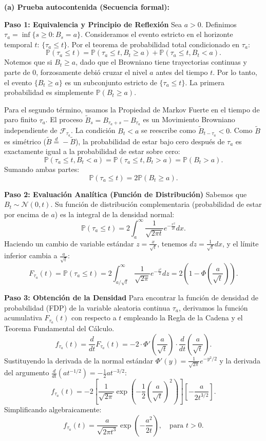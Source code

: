 \documentclass[11pt, letterpaper]{article}
\begin{document}
\begin{solucion}
    \vspace{3mm}
    \textbf{(a) Prueba autocontenida (Secuencia formal):}

    \textbf{Paso 1: Equivalencia y Principio de Reflexión}
    Sea $a > 0$. Definimos $\tau_a = \inf\{s \ge 0 : B_s = a\}$.
    Consideramos el evento estricto en el horizonte temporal $t$: $\{\tau_a \le t\}$.
    Por el teorema de probabilidad total condicionado en $\tau_a$:
    \[ \mathbb{P}(\tau_a \le t) = \mathbb{P}(\tau_a \le t, B_t \ge a) + \mathbb{P}(\tau_a \le t, B_t < a). \]
    Notemos que si $B_t \ge a$, dado que el Browniano tiene trayectorias continuas y parte de 0, forzosamente debió cruzar el nivel $a$ antes del tiempo $t$. Por lo tanto, el evento $\{B_t \ge a\}$ es un subconjunto estricto de $\{\tau_a \le t\}$. La primera probabilidad es simplemente $\mathbb{P}(B_t \ge a)$.
    
    Para el segundo término, usamos la Propiedad de Markov Fuerte en el tiempo de paro finito $\tau_a$. El proceso $\tilde{B}_s = B_{\tau_a + s} - B_{\tau_a}$ es un Movimiento Browniano independiente de $\mathcal{F}_{\tau_a}$.
    La condición $B_t < a$ se reescribe como $\tilde{B}_{t - \tau_a} < 0$.
    Como $\tilde{B}$ es simétrico ($\tilde{B} \stackrel{d}{=} -\tilde{B}$), la probabilidad de estar bajo cero después de $\tau_a$ es exactamente igual a la probabilidad de estar sobre cero:
    \[ \mathbb{P}(\tau_a \le t, B_t < a) = \mathbb{P}(\tau_a \le t, B_t > a) = \mathbb{P}(B_t > a). \]
    Sumando ambas partes:
    \[ \mathbb{P}(\tau_a \le t) = 2 \mathbb{P}(B_t \ge a). \]

    \textbf{Paso 2: Evaluación Analítica (Función de Distribución)}
    Sabemos que $B_t \sim \mathcal{N}(0, t)$. Su función de distribución complementaria (probabilidad de estar por encima de $a$) es la integral de la densidad normal:
    \[ \mathbb{P}(\tau_a \le t) = 2 \int_a^\infty \frac{1}{\sqrt{2\pi t}} e^{-\frac{x^2}{2t}} dx. \]
    Haciendo un cambio de variable estándar $z = \frac{x}{\sqrt{t}}$, tenemos $dz = \frac{1}{\sqrt{t}} dx$, y el límite inferior cambia a $\frac{a}{\sqrt{t}}$:
    \[ F_{\tau_a}(t) = \mathbb{P}(\tau_a \le t) = 2 \int_{a/\sqrt{t}}^\infty \frac{1}{\sqrt{2\pi}} e^{-\frac{z^2}{2}} dz = 2 \left( 1 - \Phi\left(\frac{a}{\sqrt{t}}\right) \right). \]

    \textbf{Paso 3: Obtención de la Densidad}
    Para encontrar la función de densidad de probabilidad (FDP) de la variable aleatoria continua $\tau_a$, derivamos la función acumulativa $F_{\tau_a}(t)$ con respecto a $t$ empleando la Regla de la Cadena y el Teorema Fundamental del Cálculo.
    \[ f_{\tau_a}(t) = \frac{d}{dt} F_{\tau_a}(t) = -2 \cdot \Phi'\left(\frac{a}{\sqrt{t}}\right) \cdot \frac{d}{dt}\left(\frac{a}{\sqrt{t}}\right). \]
    Sustituyendo la derivada de la normal estándar $\Phi'(y) = \frac{1}{\sqrt{2\pi}} e^{-y^2/2}$ y la derivada del argumento $\frac{d}{dt}(a t^{-1/2}) = -\frac{1}{2} a t^{-3/2}$:
    \[ f_{\tau_a}(t) = -2 \left[ \frac{1}{\sqrt{2\pi}} \exp\left( -\frac{1}{2} \left(\frac{a}{\sqrt{t}}\right)^2 \right) \right] \left[ -\frac{a}{2 t^{3/2}} \right]. \]
    Simplificando algebraicamente:
    \[ f_{\tau_a}(t) = \frac{a}{\sqrt{2\pi t^3}} \exp\left( -\frac{a^2}{2t} \right), \quad \text{para } t > 0. \]
    

\end{solucion}
\end{document}
